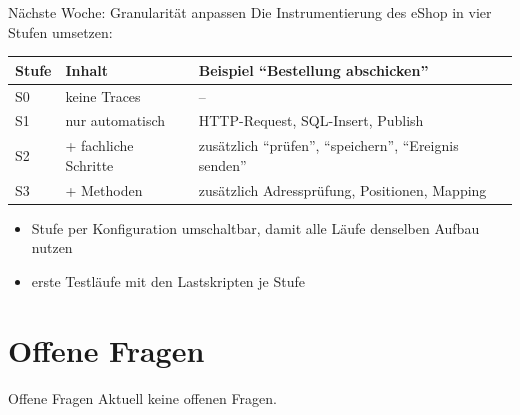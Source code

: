 \documentclass[10pt, aspectratio=169]{beamer}
\begin{document}
\begin{frame}{Nächste Woche: Granularität anpassen}
  Die Instrumentierung des eShop in vier Stufen umsetzen:

  \vspace{0.3cm}
  \small
  \begin{tabularx}{\textwidth}{@{}l l X@{}}
    \toprule
    \textbf{Stufe} & \textbf{Inhalt} & \textbf{Beispiel \enquote{Bestellung abschicken}} \\
    \midrule
    S0 & keine Traces              & -- \\
    S1 & nur automatisch           & HTTP-Request, SQL-Insert, Publish \\
    S2 & + fachliche Schritte      & zusätzlich \enquote{prüfen}, \enquote{speichern}, \enquote{Ereignis senden} \\
    S3 & + Methoden                & zusätzlich Adressprüfung, Positionen, Mapping \\
    \bottomrule
  \end{tabularx}

  \vspace{0.5cm}
  \begin{itemize}
    \item Stufe per Konfiguration umschaltbar, damit alle Läufe denselben Aufbau nutzen
    \item erste Testläufe mit den Lastskripten je Stufe
  \end{itemize}
\end{frame}

\section{Offene Fragen}

\begin{frame}{Offene Fragen}
  \centering
  \vfill
  {\Large\color{hkagray}Aktuell keine offenen Fragen.}
  \vfill
\end{frame}
\end{document}
